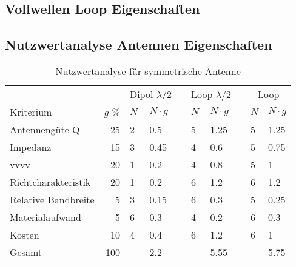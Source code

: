 \subsection{Vollwellen Loop Eigenschaften}
\subsection{Nutzwertanalyse Antennen Eigenschaften  }
\begin{table}[htb]
  \centering
  \begin{tabular}{l r l l l l l l l l} \toprule 
  && \multicolumn{2}{c}{Dipol $\lambda/2$}   && \multicolumn{2}{c}{Loop $\lambda/2$}   && \multicolumn{2}{c}{Loop} \\ \cmidrule{3-4} \cmidrule{6-7} \cmidrule{9-10}
  Kriterium                  & $g$ \%  & $N$ & $N\cdot g$               && $N$ & $N\cdot g$                  && $N$ & $N\cdot g$ \\ \midrule
  Antennengüte Q            &  25             & 2   & 0.5               && 5   & 1.25                        && 5   & 1.25 \\
  Impedanz                  &  15             & 3   & 0.45              && 4   & 0.6                         && 5   & 0.75 \\
  vvvv    &  20             & 1   & 0.2               && 4   & 0.8                         && 5   & 1 \\
  Richtcharakteristik       &  20             & 1   & 0.2               && 6   & 1.2                         && 6   & 1.2 \\
  Relative Bandbreite       &   5             & 3   & 0.15              && 6   & 0.3                         && 5   & 0.25 \\
  Materialaufwand           &   5             & 6   & 0.3               && 4   & 0.2                         && 6   & 0.3 \\
  Kosten                    &  10             & 4   & 0.4               && 6   & 1.2                         && 6   & 1 \\
  Gesamt                    & 100             &     & 2.2               &&     & 5.55                        &&     & 5.75 \\ \bottomrule
  \end{tabular}
  \caption{Nutzwertanalyse für symmetrische Antenne}
  \label{nutzwertEvaluation}
\end{table}

